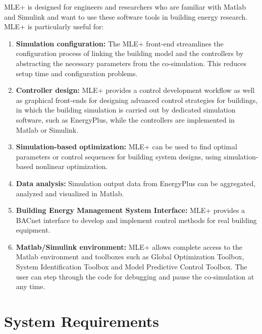 \documentclass[11pt]{article}
\begin{document}
MLE+ is designed for engineers and researchers who are familiar with
Matlab and Simulink and want to use these software tools in building
energy research.  MLE+ is particularly useful for:
\begin{enumerate}
\item \textbf{Simulation configuration:} The MLE+ front-end streamlines the
configuration process of linking the building model and the
controllers by abstracting the necessary parameters from the
co-simulation. This reduces setup time and configuration
problems.
\item \textbf{Controller design:} MLE+ provides a control development workflow as
well as graphical front-ends for designing advanced control
strategies for buildings, in which the building simulation is
carried out by dedicated simulation software, such as EnergyPlus,
while the controllers are implemented in Matlab or Simulink.
\item \textbf{Simulation-based optimization:} MLE+ can be used to find optimal
parameters or control sequences for building system designs,
using simulation-based nonlinear optimization.
\item \textbf{Data analysis:} Simulation output data from EnergyPlus can be
aggregated, analyzed and visualized in Matlab.
\item \textbf{Building Energy Management System Interface:} MLE+ provides a
BACnet interface to develop and implement control methods for
real building equipment.
\item \textbf{Matlab/Simulink environment:} MLE+ allows complete access to the
Matlab environment and toolboxes such as Global Optimization
Toolbox, System Identification Toolbox and Model Predictive
Control Toolbox. The user can step through the code for debugging
and pause the co-simulation at any time.
\end{enumerate}


\section{System Requirements}
\label{sec-2}
\end{document}
